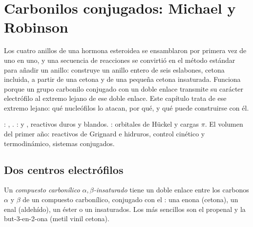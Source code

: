 \chapter{Carbonilos conjugados: Michael y Robinson}\label{ch:b2:conjugate-additions}

Los cuatro anillos de una hormona esteroidea se ensamblaron por primera vez de uno en uno, y una secuencia de
reacciones se convirtió en el método estándar para añadir un anillo: construye un anillo entero de seis eslabones, cetona
incluida, a partir de una cetona y de una pequeña cetona insaturada. Funciona porque un grupo carbonilo conjugado
con un doble enlace  transmite su carácter electrófilo al extremo lejano de ese doble enlace.
Este capítulo trata de ese extremo lejano: qué nucleófilos lo atacan, por qué, y qué puede construirse con él.

\begin{recall}
: , . : 
y , reactivos duros y blandos. : orbitales de Hückel y cargas $\pi$.
El volumen del primer año: reactivos de Grignard e hidruros, control cinético y termodinámico, sistemas
conjugados.
\end{recall}

\section{Dos centros electrófilos}

\begin{definition}\label{def:b2:conjugate-additions:enone}
Un \emph{compuesto carbonílico $\alpha,\beta$-insaturado}
tiene un doble enlace  entre los carbonos $\alpha$
y $\beta$ de un compuesto carbonílico, conjugado con el : una enona (cetona), un enal
(aldehído), un éster o un  insaturados. Los más sencillos son el propenal  y la
but-3-en-2-ona  (metil vinil cetona).
\end{definition}

